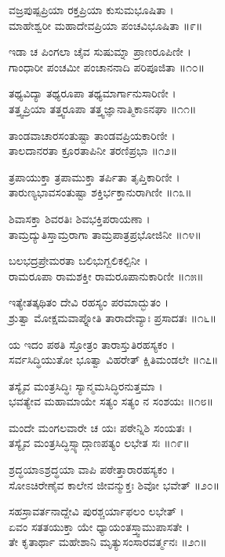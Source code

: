 ವಜ್ರಪುಷ್ಪಪ್ರಿಯಾ ರಕ್ತಪ್ರಿಯಾ ಕುಸುಮಭೂಷಿತಾ ।\\
ಮಾಹೇಶ್ವರೀ ಮಹಾದೇವಪ್ರಿಯಾ ಪಂಚವಿಭೂಷಿತಾ ॥೯॥

ಇಡಾ ಚ ಪಿಂಗಲಾ ಚೈವ ಸುಷುಮ್ನಾ ಪ್ರಾಣರೂಪಿಣೀ ।\\
ಗಾಂಧಾರೀ ಪಂಚಮೀ ಪಂಚಾನನಾದಿ ಪರಿಪೂಜಿತಾ ॥೧೦॥

ತಥ್ಯವಿದ್ಯಾ ತಥ್ಯರೂಪಾ ತಥ್ಯಮಾರ್ಗಾನುಸಾರಿಣೀ ।\\
ತತ್ತ್ವಪ್ರಿಯಾ ತತ್ತ್ವರೂಪಾ ತತ್ತ್ವಜ್ಞಾನಾತ್ಮಿಕಾಽನಘಾ ॥೧೧॥

ತಾಂಡವಾಚಾರಸಂತುಷ್ಟಾ ತಾಂಡವಪ್ರಿಯಕಾರಿಣೀ ।\\
ತಾಲದಾನರತಾ ಕ್ರೂರತಾಪಿನೀ ತರಣಿಪ್ರಭಾ ॥೧೨॥

ತ್ರಪಾಯುಕ್ತಾ ತ್ರಪಾಮುಕ್ತಾ ತರ್ಪಿತಾ ತೃಪ್ತಿಕಾರಿಣೀ ।\\
ತಾರುಣ್ಯಭಾವಸಂತುಷ್ಟಾ ಶಕ್ತಿರ್ಭಕ್ತಾನುರಾಗಿಣೀ ॥೧೩॥

ಶಿವಾಸಕ್ತಾ ಶಿವರತಿಃ ಶಿವಭಕ್ತಿಪರಾಯಣಾ ।\\
ತಾಮ್ರದ್ಯುತಿಸ್ತಾಮ್ರರಾಗಾ ತಾಮ್ರಪಾತ್ರಪ್ರಭೋಜಿನೀ ॥೧೪॥

ಬಲಭದ್ರಪ್ರೇಮರತಾ ಬಲಿಭುಗ್ಬಲಿಕಲ್ಪಿನೀ ।\\
ರಾಮರೂಪಾ ರಾಮಶಕ್ತೀ ರಾಮರೂಪಾನುಕಾರಿಣೀ ॥೧೫॥

ಇತ್ಯೇತತ್ಕಥಿತಂ ದೇವಿ ರಹಸ್ಯಂ ಪರಮಾದ್ಭುತಂ ।\\
ಶ್ರುತ್ವಾ ಮೋಕ್ಷಮವಾಪ್ನೋತಿ ತಾರಾದೇವ್ಯಾಃ ಪ್ರಸಾದತಃ ॥೧೬॥

ಯ ಇದಂ ಪಠತಿ ಸ್ತೋತ್ರಂ ತಾರಾಸ್ತುತಿರಹಸ್ಯಕಂ ।\\
ಸರ್ವಸಿದ್ಧಿಯುತೋ ಭೂತ್ವಾ ವಿಹರೇತ್ ಕ್ಷಿತಿಮಂಡಲೇ ॥೧೭॥

ತಸ್ಯೈವ ಮಂತ್ರಸಿದ್ಧಿಃ ಸ್ಯಾನ್ಮಮಸಿದ್ಧಿರನುತ್ತಮಾ ।\\
ಭವತ್ಯೇವ ಮಹಾಮಾಯೇ ಸತ್ಯಂ ಸತ್ಯಂ ನ ಸಂಶಯಃ ॥೧೮॥

ಮಂದೇ ಮಂಗಲವಾರೇ ಚ ಯಃ ಪಠೇನ್ನಿಶಿ ಸಂಯತಃ ।\\
ತಸ್ಯೈವ ಮಂತ್ರಸಿದ್ಧಿಸ್ಸ್ಯಾದ್ಗಾಣಪತ್ಯಂ ಲಭೇತ ಸಃ ॥೧೯॥

ಶ್ರದ್ಧಯಾಽಶ್ರದ್ಧಯಾ ವಾಪಿ ಪಠೇತ್ತಾರಾರಹಸ್ಯಕಂ ।\\
ಸೋಽಚಿರೇಣೈವ ಕಾಲೇನ ಜೀವನ್ಮುಕ್ತಃ ಶಿವೋ ಭವೇತ್ ॥೨೦॥

ಸಹಸ್ರಾವರ್ತನಾದ್ದೇವಿ ಪುರಶ್ಚರ್ಯಾಫಲಂ ಲಭೇತ್ ।\\
ಏವಂ ಸತತಯುಕ್ತಾ ಯೇ ಧ್ಯಾಯಂತಸ್ತ್ವಾಮುಪಾಸತೇ ।\\
ತೇ ಕೃತಾರ್ಥಾ ಮಹೇಶಾನಿ ಮೃತ್ಯುಸಂಸಾರವರ್ತ್ಮನಃ ॥೨೧॥
